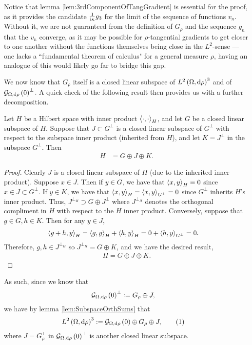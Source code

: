 \documentclass[11pt]{report}
\newcommand\labelthis{\addtocounter{equation}{1}\tag{\theequation}}
\begin{document}
Notice that lemma \ref{lem:3rdComponentOfTangGradient} is essential for the proof, as it provides the candidate $\frac{1}{\mathrm{i}\kappa}g_3$ for the limit of the sequence of functions $v_n$.
Without it, we are not guaranteed from the definition of $G_\rho$ and the sequence $g_n$ that the $v_n$ converge, as it may be possible for $\rho$-tangential gradients to get closer to one another without the functions themselves being close in the $L^2$-sense --- one lacks a ``fundamental theorem of calculus" for a general measure $\rho$, having an analogue of this would likely go far to bridge this gap.

We now know that $G_\rho$ itself is a closed linear subspace of $L^{2}\left( \Omega,\mathrm{d}\rho \right)^3$ and of $\mathcal{G}_{ \Omega, \mathrm{d}\rho}\left( 0 \right)^\perp$.
A quick check of the following result then provides us with a further decomposition.
\begin{lemma} \label{lem:SubspaceOrthSums}
	Let $H$ be a Hilbert space with inner product $\left\langle \cdot , \cdot \right\rangle_H$, and let $G$ be a closed linear subspace of $H$.
	Suppose that $J\subset G^{\perp}$ is a closed linear subspace of $G^\perp$ with respect to the subspace inner product (inherited from $H$), and let $K = J^\perp$ in the subspace $G^{\perp}$.
	Then
	\begin{align*}
		H &= G \oplus J \oplus K.
	\end{align*}
\end{lemma}
\begin{proof}
	Clearly $J$ is a closed linear subspace of $H$ (due to the inherited inner product).
	Suppose $x\in J$.
	Then if $y\in G$, we have that $\left\langle x , y \right\rangle_H = 0$ since $x\in J\subset G^\perp$.
	If $y\in K$, we have that $\left\langle x , y \right\rangle_H = \left\langle x , y \right\rangle_{G^\perp} = 0$ since $G^\perp$ inherits $H$'s inner product.
	Thus, $J^{\perp_H} \supset G \oplus J^\perp$ where $J^{\perp_H}$ denotes the orthogonal compliment in $H$ with respect to the $H$ inner product.
	Conversely, suppose that $g\in G, h\in K$.
	Then for any $y\in J$,
	\begin{align*}
		\left\langle g+h , y \right\rangle_H &= \left\langle g , y \right\rangle_H + \left\langle h , y \right\rangle_H 
		= 0 + \left\langle h , y \right\rangle_{G^\perp}
		= 0.
	\end{align*}
	Therefore, $g,h\in J^{\perp_H}$ so $J^{\perp_H} = G \oplus K$, and we have the desired result,
	\begin{align*}
		H = G \oplus J \oplus K.
	\end{align*}
\end{proof}
As such, since we know that
\begin{align*}
	\mathcal{G}_{ \Omega, \mathrm{d}\rho}\left( 0 \right)^\perp &:= G_\rho \oplus J,
\end{align*}
we have by lemma \ref{lem:SubspaceOrthSums} that
\begin{align*}
	\ltwo{\ddom}{\rho}^3 &:= \gradZero{\ddom}{\rho} \oplus G_\rho \oplus J, \labelthis\label{eq:L2Decomp}
\end{align*}
where $J = G_\rho^\perp$ in $\mathcal{G}_{ \Omega, \mathrm{d}\rho}\left( 0 \right)^\perp$ is another closed linear subspace.
\end{document}
